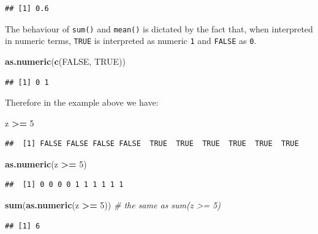\documentclass[10pt,b5paper,krantz1]{krantz}
\newenvironment{Shaded}{\begin{snugshade}}{\end{snugshade}}
\newcommand{\CommentTok}[1]{\textcolor[rgb]{0.37,0.37,0.37}{\textit{#1}}}
\newcommand{\DecValTok}[1]{\textcolor[rgb]{0.06,0.06,0.06}{#1}}
\newcommand{\KeywordTok}[1]{\textcolor[rgb]{0.27,0.27,0.27}{\textbf{#1}}}
\newcommand{\NormalTok}[1]{#1}
\newcommand{\OperatorTok}[1]{\textcolor[rgb]{0.43,0.43,0.43}{\textbf{#1}}}
\newcommand{\OtherTok}[1]{\textcolor[rgb]{0.37,0.37,0.37}{#1}}
\newcommand{\StringTok}[1]{\textcolor[rgb]{0.5,0.5,0.5}{#1}}
\begin{document}
\begin{verbatim}
## [1] 0.6
\end{verbatim}

The behaviour of \texttt{sum()} and \texttt{mean()} is dictated by the fact
that, when interpreted in numeric terms, \texttt{TRUE} is interpreted as
numeric \texttt{1} and \texttt{FALSE} as \texttt{0}.

\begin{Shaded}
\begin{Highlighting}[]
\KeywordTok{as.numeric}\NormalTok{(}\KeywordTok{c}\NormalTok{(}\OtherTok{FALSE}\NormalTok{, }\OtherTok{TRUE}\NormalTok{))}
\end{Highlighting}
\end{Shaded}

\begin{verbatim}
## [1] 0 1
\end{verbatim}

Therefore in the example above we have:

\begin{Shaded}
\begin{Highlighting}[]
\NormalTok{z }\OperatorTok{>=}\StringTok{ }\DecValTok{5}
\end{Highlighting}
\end{Shaded}

\begin{verbatim}
##  [1] FALSE FALSE FALSE FALSE  TRUE  TRUE  TRUE  TRUE  TRUE  TRUE
\end{verbatim}

\begin{Shaded}
\begin{Highlighting}[]
\KeywordTok{as.numeric}\NormalTok{(z }\OperatorTok{>=}\StringTok{ }\DecValTok{5}\NormalTok{)}
\end{Highlighting}
\end{Shaded}

\begin{verbatim}
##  [1] 0 0 0 0 1 1 1 1 1 1
\end{verbatim}

\begin{Shaded}
\begin{Highlighting}[]
\KeywordTok{sum}\NormalTok{(}\KeywordTok{as.numeric}\NormalTok{(z }\OperatorTok{>=}\StringTok{ }\DecValTok{5}\NormalTok{)) }\CommentTok{# the same as sum(z >= 5)}
\end{Highlighting}
\end{Shaded}

\begin{verbatim}
## [1] 6
\end{verbatim}
\end{document}
